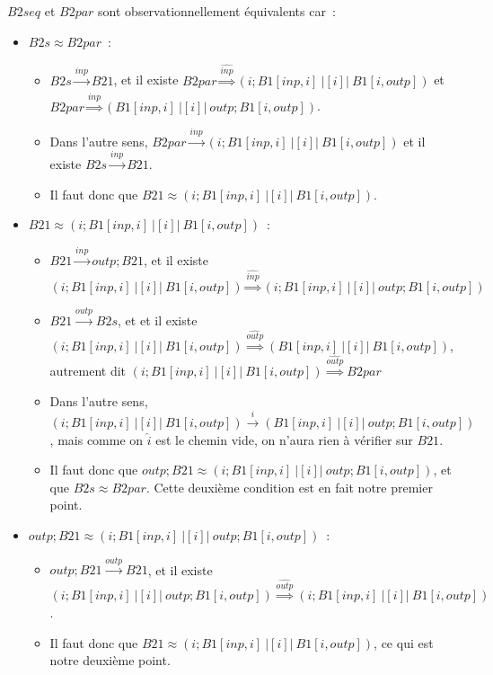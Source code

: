 \documentclass[a4paper,french,12pt]{article}
\def\transition#1{\stackrel{#1}{\longrightarrow}}
\def\Transition#1{\stackrel{#1}{\Longrightarrow}}
\def\observationnelle{\approx}
\begin{document}
{\raggedright
  $B2seq$ et $B2par$ sont observationnellement équivalents car~:
  \begin{itemize}
  \item $B2s \observationnelle B2par$~:
    \begin{itemize}
    \item $B2s\transition{inp} B21$,
      et il existe $B2par \Transition{\hat{inp}} (i;B1[inp,i] \ |[i]|\ B1[i,outp])$
      et $B2par \Transition{\hat{inp}} (B1[inp,i] \ |[i]|\ outp;B1[i,outp])$.
    \item Dans l'autre sens,
      $B2par \transition{inp} (i;B1[inp,i] \ |[i]|\ B1[i,outp])$
      et il existe $B2s\transition{inp} B21$.
    \item Il faut donc que $B21 \observationnelle (i;B1[inp,i] \ |[i]|\ B1[i,outp])$.
    \end{itemize}
  \item $B21 \observationnelle (i;B1[inp,i] \ |[i]|\ B1[i,outp])$~:
    \begin{itemize}
    \item $B21 \transition{inp} outp;B21$,
      et il existe
      $(i;B1[inp,i] \ |[i]|\  B1[i,outp]) \Transition{\hat{inp}} (i;B1[inp,i] \ |[i]|\ outp;B1[i,outp])$
    \item $B21 \transition{outp} B2s$, et
      et il existe
      $(i;B1[inp,i] \ |[i]|\  B1[i,outp]) \Transition{\hat{outp}} (B1[inp,i] \ |[i]|\ B1[i,outp])$,
      autrement dit
      $(i;B1[inp,i] \ |[i]|\  B1[i,outp]) \Transition{\hat{outp}} B2par$
    \item Dans l'autre sens,
      $(i;B1[inp,i] \ |[i]|\ B1[i,outp]) \transition{i} (B1[inp,i] \ |[i]|\ outp;B1[i,outp])$,
      mais comme on $\hat{i}$ est le chemin vide, on n'aura rien à vérifier sur $B21$.
    \item Il faut donc que $outp;B21 \observationnelle (i;B1[inp,i] \ |[i]|\ outp;B1[i,outp])$,
      et que $B2s \observationnelle B2par$. Cette deuxième condition est en fait notre premier point.
    \end{itemize}
  \item $outp;B21 \observationnelle (i;B1[inp,i] \ |[i]|\ outp;B1[i,outp])$~:
    \begin{itemize}
    \item $outp;B21 \transition{outp}B21$,
      et il existe
      $(i;B1[inp,i] \ |[i]|\ outp;B1[i,outp]) \Transition{\hat{outp}} (i;B1[inp,i] \ |[i]|\ B1[i,outp])$.
    \item Il faut donc que $B21 \observationnelle (i;B1[inp,i] \ |[i]|\ B1[i,outp])$, ce qui est notre deuxième point.
    \end{itemize}
  \end{itemize}
}
\end{document}
